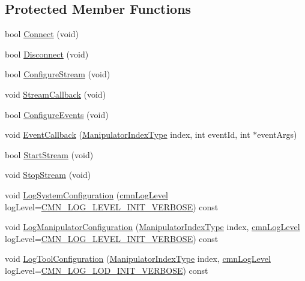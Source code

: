 \subsection*{Protected Member Functions}
\begin{DoxyCompactItemize}
\item 
bool \hyperlink{classmts_intuitive_da_vinci_a1c7a11d91811719e85d07e69bbb36bb3}{Connect} (void)
\item 
bool \hyperlink{classmts_intuitive_da_vinci_aed9a190c4308a6d2d3b2beb8a33e797b}{Disconnect} (void)
\item 
bool \hyperlink{classmts_intuitive_da_vinci_a57cf6b0b4b903a23b1a24fe94da730e2}{Configure\+Stream} (void)
\item 
void \hyperlink{classmts_intuitive_da_vinci_ad78560093b99be66a0f40502145f2c38}{Stream\+Callback} (void)
\item 
bool \hyperlink{classmts_intuitive_da_vinci_a16c2a6008fbd486878aa6774a4d49d5f}{Configure\+Events} (void)
\item 
void \hyperlink{classmts_intuitive_da_vinci_a0e5df412e4b6fc1f9752942626d10f1e}{Event\+Callback} (\hyperlink{classmts_intuitive_da_vinci_a32a63e2057b2c00c8f08685f8f5736f4}{Manipulator\+Index\+Type} index, int event\+Id, int $\ast$event\+Args)
\item 
bool \hyperlink{classmts_intuitive_da_vinci_a5f080d90e55a9ed84c21800f8f49dbce}{Start\+Stream} (void)
\item 
void \hyperlink{classmts_intuitive_da_vinci_a220ac807e83874eff2f243ee881ab4c8}{Stop\+Stream} (void)
\item 
void \hyperlink{classmts_intuitive_da_vinci_a085407a34a4d45778710482d3edba3e7}{Log\+System\+Configuration} (\hyperlink{cmn_log_lo_d_8h_a70c67165c37a0971e0dd1a85d4edaaae}{cmn\+Log\+Level} log\+Level=\hyperlink{cmn_log_lo_d_8h_ae0fcf22a2f3faaba0c5bf49a237e3f3e}{C\+M\+N\+\_\+\+L\+O\+G\+\_\+\+L\+E\+V\+E\+L\+\_\+\+I\+N\+I\+T\+\_\+\+V\+E\+R\+B\+O\+S\+E}) const 
\item 
void \hyperlink{classmts_intuitive_da_vinci_a0c7d45062de8ee765c912897c67922ad}{Log\+Manipulator\+Configuration} (\hyperlink{classmts_intuitive_da_vinci_a32a63e2057b2c00c8f08685f8f5736f4}{Manipulator\+Index\+Type} index, \hyperlink{cmn_log_lo_d_8h_a70c67165c37a0971e0dd1a85d4edaaae}{cmn\+Log\+Level} log\+Level=\hyperlink{cmn_log_lo_d_8h_ae0fcf22a2f3faaba0c5bf49a237e3f3e}{C\+M\+N\+\_\+\+L\+O\+G\+\_\+\+L\+E\+V\+E\+L\+\_\+\+I\+N\+I\+T\+\_\+\+V\+E\+R\+B\+O\+S\+E}) const 
\item 
void \hyperlink{classmts_intuitive_da_vinci_a5c70042fc47eb53118c1a9b489c8052b}{Log\+Tool\+Configuration} (\hyperlink{classmts_intuitive_da_vinci_a32a63e2057b2c00c8f08685f8f5736f4}{Manipulator\+Index\+Type} index, \hyperlink{cmn_log_lo_d_8h_a70c67165c37a0971e0dd1a85d4edaaae}{cmn\+Log\+Level} log\+Level=\hyperlink{cmn_log_lo_d_8h_a019ecc9e1487050d540772de22800f44}{C\+M\+N\+\_\+\+L\+O\+G\+\_\+\+L\+O\+D\+\_\+\+I\+N\+I\+T\+\_\+\+V\+E\+R\+B\+O\+S\+E}) const 

\end{DoxyCompactItemize}
